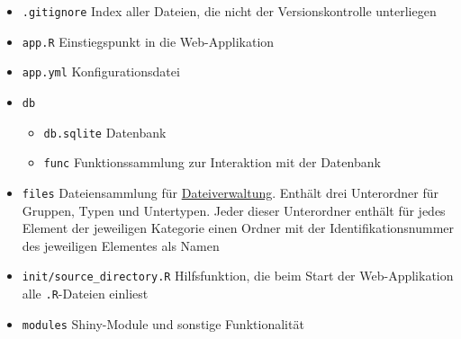 \documentclass[
]{article}
\providecommand{\tightlist}{%
  \setlength{\itemsep}{0pt}\setlength{\parskip}{0pt}}
\begin{document}
\begin{itemize}
\tightlist
\item
  \texttt{.gitignore} Index aller Dateien, die nicht der Versionskontrolle unterliegen
\item
  \texttt{app.R} Einstiegspunkt in die Web-Applikation
\item
  \texttt{app.yml} Konfigurationsdatei
\item
  \texttt{db}

  \begin{itemize}
  \tightlist
  \item
    \texttt{db.sqlite} Datenbank
  \item
    \texttt{func} Funktionssammlung zur Interaktion mit der Datenbank
  \end{itemize}
\item
  \texttt{files} Dateiensammlung für \protect\hyperlink{file-management}{Dateiverwaltung}. Enthält drei Unterordner für Gruppen, Typen und Untertypen. Jeder dieser Unterordner enthält für jedes Element der jeweiligen Kategorie einen Ordner mit der Identifikationsnummer des jeweiligen Elementes als Namen
\item
  \texttt{init/source\_directory.R} Hilfsfunktion, die beim Start der Web-Applikation alle \texttt{.R}-Dateien einliest
\item
  \texttt{modules} Shiny-Module und sonstige Funktionalität


\end{itemize}
\end{document}
